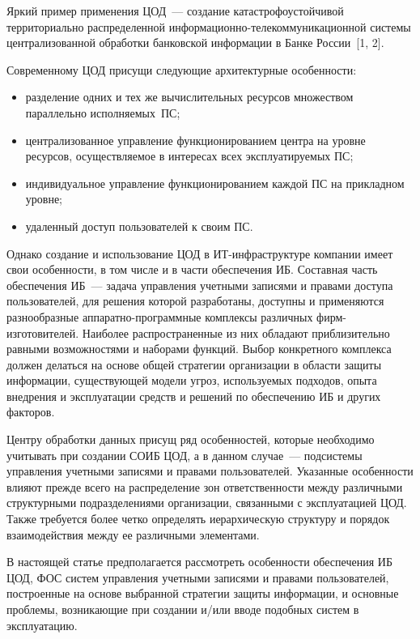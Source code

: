 \begin{multicols}{2}
       Яркий пример применения ЦОД~--- создание катастрофоустойчивой 
территориально распределенной информационно-телекоммуникационной сис\-те\-мы 
централизованной обработки банковской информа\-ции в Банке России~[1, 2]. 
       
       Современному ЦОД присущи следующие архитектурные особенности:
       \begin{itemize}
        \item  разделение одних и тех же вычислительных ресурсов множеством параллельно 
исполня\-емых~ПС;
       \item 
централизованное управление функционированием центра на уровне ресурсов, 
осуществляемое в интересах всех эксплуатируемых ПС;
       \item 
индивидуальное управление функционированием каждой ПС на прикладном уровне;
       \item 
удаленный доступ пользователей к своим ПС.
\end{itemize}

       Однако создание и использование ЦОД в ИТ-ин\-фра\-струк\-ту\-ре компании 
имеет свои особен\-ности, в том числе и в части обеспечения 
ИБ. Со\-став\-ная часть обеспечения ИБ~--- задача управления учетными 
записями и правами доступа пользователей, для решения которой разработаны, доступны 
и применяются разнообразные ап\-па\-рат\-но-про\-грам\-мные комплексы различных 
фирм-изготовителей. Наиболее распространенные из них обладают приблизительно 
равными возможностями и наборами функций. Выбор конкретного комплекса должен 
делаться на основе общей стратегии организации в области защиты информации, 
существующей модели угроз, используемых подходов, опыта внедрения и эксплуатации 
средств и решений по обеспечению ИБ и других факторов.
       
       Центру обработки данных присущ ряд особенностей, которые необходимо учитывать при 
создании  СОИБ ЦОД, а в данном случае~--- 
под\-сис\-те\-мы управ\-ле\-ния учетными записями и правами пользователей. Указанные 
особенности влияют прежде всего на распределение зон ответственности между 
различными структурными подразделениями организации, связанными с эксплуатацией 
ЦОД. Также требуется более четко определять иерархическую структуру и порядок 
взаимодействия между ее различными элементами.
       
       В настоящей статье предполагается рас\-смот\-реть особенности обеспечения ИБ 
ЦОД, ФОС сис\-тем управ\-ле\-ния 
учетными записями и правами пользователей, построенные на основе выбранной 
стратегии защиты информации, и основные проблемы, воз\-ни\-ка\-ющие при создании и/или 
вводе подобных сис\-тем в эксплуатацию.


\end{multicols}
